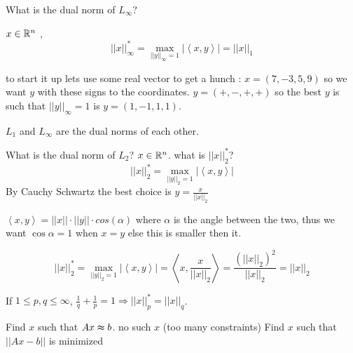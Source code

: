 \begin{xca}
What is the dual norm of $L_{\infty}$?
\begin{sol}
$x\in\mathbb{R}^{n}$ ,
\[
\left|\left|x\right|\right|_{\infty}^{*}=\max_{\left|\left|y\right|\right|_{\infty}=1}\left|\left\langle x,y\right\rangle \right|=\left|\left|x\right|\right|_{1}
\]

\begin{insight}
to start it up lets use some real vector to get a hunch : $x=\left(7,-3,5,9\right)$
so we want $y$ with these signs to the coordinates. $y=\left(+,-,+,+\right)$
so the best $y$ is such that $\left|\left|y\right|\right|_{\infty}=1$
is $y=\left(1,-1,1,1\right)$. %
\begin{insight}
$L_{1}$ and $L_{\infty}$ are the dual norms of each other.%
\end{insight}
\end{insight}

\end{sol}

\end{xca}

\begin{example}
What is the dual norm of $L_{2}$? $x\in\mathbb{R}^{n}$. what is $\left|\left|x\right|\right|_{2}^{*}$?
\[
\left|\left|x\right|\right|_{2}^{*}=\max_{\left|\left|y\right|\right|_{2}=1}\left|\left\langle x,y\right\rangle \right|
\]
 By Cauchy Schwartz the best choice is $y=\frac{x}{\left|\left|x\right|\right|_{2}}$
\begin{insight}
$\left\langle x,y\right\rangle =\left|\left|x\right|\right|\cdot\left|\left|y\right|\right|\cdot cos\left(\alpha\right)$
where $\alpha$ is the angle between the two, thus we want $\cos\alpha=1$
when $x=y$ else this is smaller then it.%
\end{insight}
\[
\left|\left|x\right|\right|_{2}^{*}=\max_{\left|\left|y\right|\right|_{2}=1}\left|\left\langle x,y\right\rangle \right|=\left\langle x,\frac{x}{\left|\left|x\right|\right|_{2}}\right\rangle =\frac{\left(\left|\left|x\right|\right|_{2}\right)^{2}}{\left|\left|x\right|\right|_{2}}=\left|\left|x\right|\right|_{2}
\]
\end{example}

\begin{claim}
If $1\le p,q\le\infty$, $\frac{1}{q}+\frac{1}{p}=1\Rightarrow\left|\left|x\right|\right|_{p}^{*}=\left|\left|x\right|\right|_{q}$.
\end{claim}

\begin{insight}
Find $x$ such that $Ax\thickapprox b$. no such $x$ (too many constraints)
Find $x$ such that $\left|\left|Ax-b\right|\right|$ is minimized%
\end{insight}

